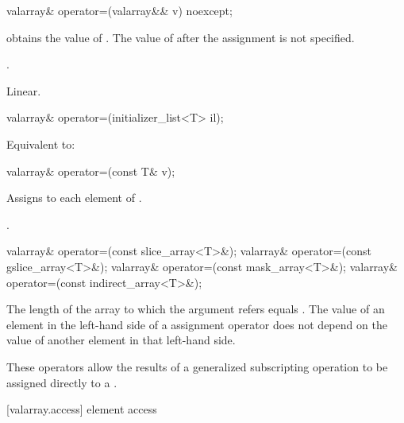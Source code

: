 %
\begin{itemdecl}
valarray& operator=(valarray&& v) noexcept;
\end{itemdecl}

\begin{itemdescr}
\pnum
\effects {} obtains the value of .
The value of  after the assignment is not specified.

\pnum
\returns {}.

\pnum
\complexity Linear.
\end{itemdescr}

%
\begin{itemdecl}
valarray& operator=(initializer_list<T> il);
\end{itemdecl}

\begin{itemdescr}
\pnum
\effects Equivalent to: 
\end{itemdescr}


%
\begin{itemdecl}
valarray& operator=(const T& v);
\end{itemdecl}

\begin{itemdescr}
\pnum
\effects
Assigns  to each element of .

\pnum
\returns {}.
\end{itemdescr}

%
\begin{itemdecl}
valarray& operator=(const slice_array<T>&);
valarray& operator=(const gslice_array<T>&);
valarray& operator=(const mask_array<T>&);
valarray& operator=(const indirect_array<T>&);
\end{itemdecl}

\begin{itemdescr}
\pnum
\requires The length of the array to which the argument refers equals .
The value of an element in the left-hand side of a  assignment
operator does not depend on the value of another element in that left-hand side.

\pnum
These operators allow the results of a generalized subscripting operation
to be assigned directly to a
.
\end{itemdescr}

[valarray.access]{ element access}

